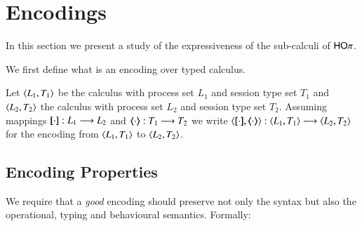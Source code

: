 \newcommand{\enc}[2]{\lrangle{\map{#1}, \mapt{#2}}}
\newcommand{\encod}[3]{\lrangle{\map{#1}^{#3}, \mapt{#2}^{#3}}}

\newcommand{\calc}[2]{\lrangle{#1, #2}}

\section{Encodings}

In this section we present a study of the expressiveness 
of the sub-calculi of $\mathsf{HO}\pi$.

We first define what is an encoding over typed calculus.

\begin{definition}
	Let $\calc{L_1}{T_1}$ be the calculus with process set $L_1$ and
	session type set $T_1$ and
	$\calc{L_2}{T_2}$ the calculus with process set $L_2$ and
	session type set $T_2$.
	Assuming mappings $[\!\![\cdot]\!\!]: L_1 \longrightarrow L_2$ and
	$\langle\!\!\langle\cdot\rangle\!\!\rangle: T_1 \longrightarrow T_2$
	we write $\enc{\cdot}{\cdot}: \calc{L_1}{T_1} \longrightarrow \calc{L_2}{T_2}$
	for the encoding from
	$\calc{L_1}{T_1}$ to $\calc{L_2}{T_2}$.
\end{definition}

\subsection{Encoding Properties}

We require that a {\em good} encoding should 
preserve not only the syntax but
also the operational, typing and behavioural
semantics. Formally:

